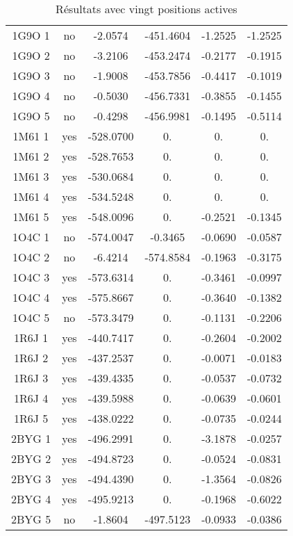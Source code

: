 \begin{table}[h]
\begin{tabular}{cccccc}
        1G9O 1 & no   &  -2.0574   & -451.4604 & -1.2525 & -1.2525 \\ 
        1G9O 2 & no   &  -3.2106   & -453.2474 & -0.2177 & -0.1915 \\ 
        1G9O 3 & no   &  -1.9008   & -453.7856 & -0.4417 & -0.1019 \\ 
        1G9O 4 & no   &  -0.5030   & -456.7331 & -0.3855 & -0.1455 \\ 
        1G9O 5 & no   &  -0.4298   & -456.9981 & -0.1495 & -0.5114 \\ 
        1M61 1 & yes  & -528.0700 & 0. & 0. & 0. \\               
        1M61 2 & yes  & -528.7653 & 0. & 0. & 0. \\               
        1M61 3 & yes  & -530.0684 & 0. & 0. & 0. \\               
        1M61 4 & yes  & -534.5248 & 0. & 0. & 0.\\               
        1M61 5 & yes  & -548.0096 & 0. & -0.2521 & -0.1345 \\     
        1O4C 1 & no   &  -574.0047 & -0.3465 & -0.0690 & -0.0587 \\    
        1O4C 2 & no   &  -6.4214   & -574.8584 & -0.1963 & -0.3175 \\         
        1O4C 3 & yes  & -573.6314 &  0. & -0.3461 & -0.0997 \\             
        1O4C 4 & yes  & -575.8667 &  0. & -0.3640 & -0.1382 \\             
        1O4C 5 & no   & -573.3479 &  0. & -0.1131 & -0.2206 \\      
        1R6J 1 & yes  & -440.7417 &  0. & -0.2604 & -0.2002 \\        
        1R6J 2 & yes  & -437.2537 &  0. & -0.0071 & -0.0183 \\        
        1R6J 3 & yes  & -439.4335 &  0. & -0.0537 & -0.0732 \\       
        1R6J 4 & yes  & -439.5988 &  0. & -0.0639 & -0.0601 \\        
        1R6J 5 & yes  & -438.0222 &  0. & -0.0735 & -0.0244 \\        
        2BYG 1 & yes  & -496.2991 &  0. & -3.1878 & -0.0257 \\        
        2BYG 2 & yes  & -494.8723 &  0. & -0.0524 & -0.0831 \\        
        2BYG 3 & yes  & -494.4390 &  0. & -1.3564 & -0.0826 \\        
        2BYG 4 & yes  & -495.9213 &  0. & -0.1968 & -0.6022 \\        
        2BYG 5 & no   &  -1.8604   & -497.5123 & -0.0933 & -0.0386 \\   
       \bottomrule


 \end{tabular}   
 \caption{Résultats  avec vingt positions actives }
\label{tab:result_20_actives}   
\end{table}


